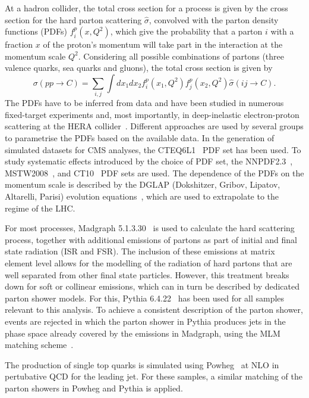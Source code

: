 At a hadron collider, the total cross section for a process is given by the cross section for the hard parton scattering $\hat{\sigma}$, convolved with the parton density functions (PDFs) $f^p_i(x,Q^2)$, which give the probability that a parton $i$ with a fraction $x$ of the proton's momentum will take part in the interaction at the momentum scale $Q^2$. Considering all possible combinations of partons (three valence quarks, sea quarks and gluons), the total cross section is given by
\begin{equation}
\sigma (pp \rightarrow C)  = \sum\limits_{i,j} \int dx_1 dx_2 f^p_i (x_1,Q^2) f^p_j(x_2,Q^2) \hat{\sigma}(ij\rightarrow C).
\end{equation} 
The PDFs have to be inferred from data and have been studied in numerous fixed-target experiments and, most importantly, in deep-inelastic electron-proton scattering at the HERA collider~\cite{Aaron:2009aa}. Different approaches are used by several groups to parametrise the PDFs based on the available data. In the generation of simulated datasets for CMS analyses, the CTEQ6L1~\cite{Pumplin:2002vw} PDF set has been used. To study systematic effects introduced by the choice of PDF set, the NNPDF2.3~\cite{Ball:2012cx}, MSTW2008~\cite{Martin:2009iq}, and CT10~\cite{Lai:2010vv} PDF sets are used. The dependence of the PDFs on the momentum scale is described by the DGLAP (Dokshitzer, Gribov, Lipatov, Altarelli, Parisi) evolution equations~\cite{Gribov,Altarelli:1977zs,Dokshitzer}, which are used to extrapolate to the regime of the LHC. 

For most processes, Madgraph 5.1.3.30~\cite{Alwall:2011uj} is used to calculate the hard scattering process, together with additional emissions of partons as part of initial and final state radiation (ISR and FSR). The inclusion of these emissions at matrix element level allows for the modelling of the radiation of hard partons that are well separated from other final state particles. However, this treatment breaks down for soft or collinear emissions, which can in turn be described by dedicated parton shower models. For this, Pythia 6.4.22~\cite{Pythia} has been used for all samples relevant to this analysis. To achieve a consistent description of the parton shower, events are rejected in which the parton shower in Pythia produces jets in the phase space already covered by the emissions in Madgraph, using the MLM matching scheme~\cite{Hoche:2006ph}. 

The production of single top quarks is simulated using Powheg~\cite{Powheg,Alioli:2009je,Re:2010bp} at NLO in pertubative QCD for the leading jet. For these samples, a similar matching of the parton showers in Powheg and Pythia is applied.  
 
